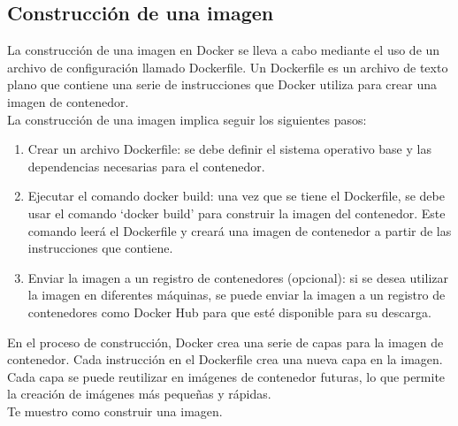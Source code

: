 \documentclass{article}
\begin{document}
\subsection{Construcción de una imagen}
La construcción de una imagen en Docker se lleva a cabo mediante el uso de un archivo de configuración llamado Dockerfile. Un Dockerfile es un archivo de texto plano que contiene una serie de instrucciones que Docker utiliza para crear una imagen de contenedor.\\
La construcción de una imagen implica seguir los siguientes pasos:
\begin{enumerate}
      \item Crear un archivo Dockerfile: se debe definir el sistema operativo base y las dependencias necesarias para el contenedor.
      \item Ejecutar el comando docker build: una vez que se tiene el Dockerfile, se debe usar el comando \enquote*{docker build} para construir la imagen del contenedor. Este comando leerá el Dockerfile y creará una imagen de contenedor a partir de las instrucciones que contiene.
      \item Enviar la imagen a un registro de contenedores (opcional): si se desea utilizar la imagen en diferentes máquinas, se puede enviar la imagen a un registro de contenedores como Docker Hub para que esté disponible para su descarga.
\end{enumerate}
En el proceso de construcción, Docker crea una serie de capas para la imagen de contenedor. Cada instrucción en el Dockerfile crea una nueva capa en la imagen. Cada capa se puede reutilizar en imágenes de contenedor futuras, lo que permite la creación de imágenes más pequeñas y rápidas.\\
Te muestro como construir una imagen.
\end{document}
